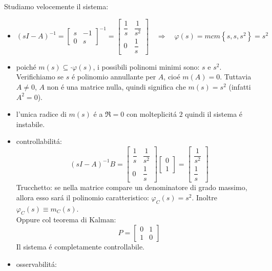 \documentclass[../main.tex]{subfiles}
\begin{document}
\begin{mdframed}[style=Exercise]
\begin{Exercise}[title={Retroazione algebrica sull'uscita}, difficulty=1]
				Studiamo velocemente il sistema:
				\begin{itemize}
					\item 
						\[
							(sI-A)^{-1} =
							\begin{bmatrix}
								s & -1\\
								0 & s
							\end{bmatrix}^{-1} =
							\begin{bmatrix}
								\dfrac{1}{s} & \dfrac{1}{s^2}\\[.5cm]
								0 & \dfrac{1}{s}
							\end{bmatrix}
							\quad\Rightarrow\quad
							\varphi(s) = mcm\left\lbrace s, s, s^2 \right\rbrace = s^2
						\]
					\item 
						poich\'e $ m(s) \subseteq\cdot \varphi(s) $, i possibili polinomi minimi sono: $ s $ e $ s^2 $. Verifichiamo se $ s $ \'e polinomio annullante per $ A $, cio\'e $ m(A) = 0 $. Tuttavia $ A \neq 0 $, $ A $ non \'e una matrice nulla, quindi significa che $ m(s) = s^2 $ (infatti $ A^2 = 0 $).
					\item 
						l'unica radice di $ m(s) $ \'e a $ \Re = 0 $ con molteplicit\'a $ 2 $ quindi il sistema \'e instabile.
					\item 
						controllabilit\'a:
						\[
							(sI-A)^{-1}B=
							\begin{bmatrix}
								\dfrac{1}{s} & \dfrac{1}{s^2}\\[.5cm]
								0 & \dfrac{1}{s}
							\end{bmatrix}
							\begin{bmatrix}
								0\\
								1
							\end{bmatrix} =
							\begin{bmatrix}
								\dfrac{1}{s^2}\\[.5cm]
								\dfrac{1}{s}
							\end{bmatrix}
						\]
						Trucchetto: se nella matrice compare un denominatore di grado massimo, allora esso sar\'a il polinomio caratteristico: $ \varphi_C(s) = s^2 $. Inoltre $ \varphi_C(s) \equiv m_C(s) $.\\
						Oppure col teorema di Kalman:
						\[
							P =
							\begin{bmatrix}
								0 & 1\\
								1 & 0
							\end{bmatrix}
						\]
						Il sistema \'e completamente controllabile.
					\item 
						osservabilit\'a:
						\[
\]
\end{itemize}
\end{Exercise}
\end{mdframed}
\end{document}
